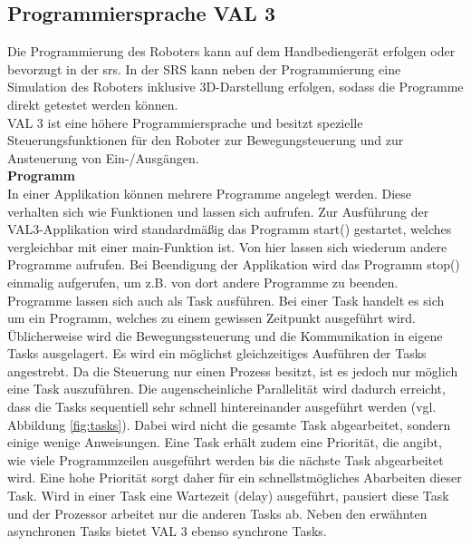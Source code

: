 \documentclass[ a4paper,
                oneside,
                toc=bibliography,
                toc=listof
                ]{scrbook}
\begin{document}
   	\subsection{Programmiersprache VAL 3}
   	Die Programmierung des Roboters kann auf dem Handbediengerät erfolgen oder bevorzugt in der \ac{srs}. In der SRS kann neben der Programmierung eine Simulation des Roboters inklusive 3D-Darstellung erfolgen, sodass die Programme direkt getestet werden können.\\
   	\glqq VAL 3\grqq{} ist eine höhere Programmiersprache und besitzt spezielle Steuerungsfunktionen für den Roboter zur Bewegungsteuerung und zur Ansteuerung von Ein-/Ausgängen. \cite{VAL3} \vspace{0.5\baselineskip}\\
   	\textbf{Programm} \\
   	In einer Applikation können mehrere Programme angelegt werden. Diese verhalten sich wie Funktionen und lassen sich aufrufen. Zur Ausführung der VAL3-Applikation wird standardmäßig das Programm \glqq start()\grqq{} gestartet, welches vergleichbar mit einer \glqq main-Funktion\grqq{} ist. Von hier lassen sich wiederum andere Programme aufrufen. Bei Beendigung der Applikation wird das Programm \glqq stop()\grqq{} einmalig aufgerufen, um z.B. von dort andere Programme zu beenden.\\
   	Programme lassen sich auch als Task ausführen. Bei einer Task handelt es sich um ein Programm, welches zu einem gewissen Zeitpunkt ausgeführt wird. Üblicherweise wird die Bewegungssteuerung und die Kommunikation in eigene Tasks ausgelagert. Es wird ein möglichst gleichzeitiges Ausführen der Tasks angestrebt. Da die Steuerung  nur einen Prozess besitzt, ist es jedoch nur möglich eine Task auszuführen. Die augenscheinliche Parallelität wird dadurch erreicht, dass die Tasks sequentiell sehr schnell hintereinander ausgeführt werden (vgl. Abbildung \ref{fig:tasks}). Dabei wird nicht die gesamte Task abgearbeitet, sondern einige wenige Anweisungen. Eine Task erhält zudem eine Priorität, die angibt, wie viele Programmzeilen ausgeführt werden bis die nächste Task abgearbeitet wird. Eine hohe Priorität sorgt daher für ein schnellstmögliches Abarbeiten dieser Task. Wird in einer Task eine Wartezeit (\glqq delay\grqq) ausgeführt, pausiert diese Task und der Prozessor arbeitet nur die anderen Tasks ab. Neben den erwähnten asynchronen Tasks bietet VAL 3 ebenso synchrone Tasks.\\
\end{document}
